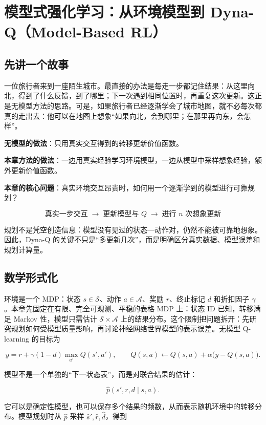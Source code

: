 \documentclass{article}
\begin{document}
\section*{模型式强化学习：从环境模型到 Dyna-Q（Model-Based RL）}

\subsection*{先讲一个故事}

一位旅行者来到一座陌生城市。最直接的办法是每走一步都记住结果：从这里向北，得到了什么反馈，到了哪里；下一次遇到相同位置时，再重复这次更新。这正是无模型方法的思路。可是，如果旅行者已经逐渐学会了城市地图，就不必每次都真的走出去：他可以在地图上想象“如果向北，会到哪里；在那里再向东，会怎样”。

\textbf{无模型的做法}：只用真实交互得到的转移更新价值函数。

\textbf{本章方法的做法}：一边用真实经验学习环境模型，一边从模型中采样想象经验，额外更新价值函数。

\textbf{本章的核心问题}：真实环境交互昂贵时，如何用一个逐渐学到的模型进行可靠规划？

\[
\boxed{\text{真实一步交互} \;\longrightarrow\; \text{更新模型与 }Q \;\longrightarrow\; \text{进行 }n\text{ 次想象更新}}
\]

规划不是凭空创造信息：模型没有见过的状态—动作对，仍然不能被可靠地想象。因此，Dyna-Q 的关键不只是“多更新几次”，而是明确区分真实数据、模型误差和规划计算量。

\subsection*{数学形式化}

环境是一个 MDP：状态 $s\in\mathcal S$、动作 $a\in\mathcal A$、奖励 $r$、终止标记 $d$ 和折扣因子 $\gamma$。本章先固定在有限、完全可观测、平稳的表格 MDP 上：状态 ID 已知，转移满足 Markov 性，模型只需估计 $\mathcal S\times\mathcal A$ 上的结果分布。这个限制把问题拆开：先研究规划如何受模型质量影响，再讨论神经网络世界模型的表示误差。无模型 Q-learning 的目标为

\[
 y=r+\gamma(1-d)\max_{a'}Q(s',a'),\qquad
 Q(s,a)\leftarrow Q(s,a)+\alpha\bigl(y-Q(s,a)\bigr).
\]

模型不是一个单独的“下一状态表”，而是对联合结果的估计：

\[
\boxed{\hat p(s',r,d\mid s,a)}.
\]

它可以是确定性模型，也可以保存多个结果的频数，从而表示随机环境中的转移分布。模型规划时从 $\hat p$ 采样 $\hat s',\hat r,\hat d$，得到
\end{document}
